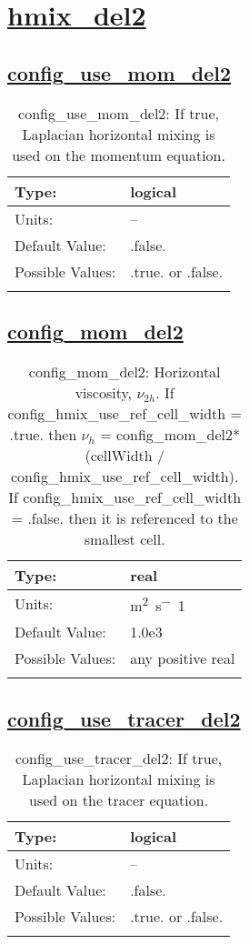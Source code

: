\section[hmix\_del2]{\hyperref[sec:nm_tab_hmix_del2]{hmix\_del2}}
\label{sec:nm_sec_hmix_del2}
\subsection[config\_use\_mom\_del2]{\hyperref[sec:nm_tab_hmix_del2]{config\_use\_mom\_del2}}
\label{subsec:nm_sec_config_use_mom_del2}
\begin{center}
\begin{longtable}{| p{2.0in} || p{4.0in} |}
    \hline
    Type: & logical \\
    \hline
    Units: & -- \\
    \hline
    Default Value: & .false. \\
    \hline
    Possible Values: & .true. or .false. \\
    \hline
    \caption{config\_use\_mom\_del2: If true, Laplacian horizontal mixing is used on the momentum equation.}
\end{longtable}
\end{center}
\subsection[config\_mom\_del2]{\hyperref[sec:nm_tab_hmix_del2]{config\_mom\_del2}}
\label{subsec:nm_sec_config_mom_del2}
\begin{center}
\begin{longtable}{| p{2.0in} || p{4.0in} |}
    \hline
    Type: & real \\
    \hline
    Units: & \si{m^2.s^-1} \\
    \hline
    Default Value: & 1.0e3 \\
    \hline
    Possible Values: & any positive real \\
    \hline
    \caption{config\_mom\_del2: Horizontal viscosity, $\nu_{2h}$. If config\_hmix\_use\_ref\_cell\_width = .true. then $\nu_h$ = config\_mom\_del2*(cellWidth / config\_hmix\_use\_ref\_cell\_width). If config\_hmix\_use\_ref\_cell\_width = .false. then it is referenced to the smallest cell.}
\end{longtable}
\end{center}
\subsection[config\_use\_tracer\_del2]{\hyperref[sec:nm_tab_hmix_del2]{config\_use\_tracer\_del2}}
\label{subsec:nm_sec_config_use_tracer_del2}
\begin{center}
\begin{longtable}{| p{2.0in} || p{4.0in} |}
    \hline
    Type: & logical \\
    \hline
    Units: & -- \\
    \hline
    Default Value: & .false. \\
    \hline
    Possible Values: & .true. or .false. \\
    \hline
    \caption{config\_use\_tracer\_del2: If true, Laplacian horizontal mixing is used on the tracer equation.}
\end{longtable}
\end{center}
